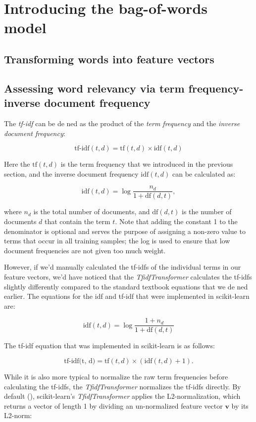 \documentclass[letterpaper]{report}
\begin{document}
\section{Introducing the bag-of-words model}
\subsection{Transforming words into feature vectors}
\subsection{Assessing word relevancy via term frequency-inverse document frequency}

The \textit{tf-idf} can be de ned as the product of the \textit{term frequency} and the \textit{inverse document frequency}:

\[
\text{tf-idf}(t, d) = \text{tf} (t, d) \times \text{idf}(t, d)
\]

Here the $\text{tf}(t, d)$ is the term frequency that we introduced in the previous section,
and the inverse document frequency $\text{idf}(t, d)$ can be calculated as:

\[
\text{idf}(t, d) = \log \frac{n_d}{1 + \text{df}(d, t)},
\]

where $n_d$ is the total number of documents, and $\text{df}(d, t)$  is the number of documents $d$ that contain the term $t$. Note that adding the constant 1 to the denominator is optional and serves the purpose of assigning a non-zero value to terms that occur in all training samples; the log is used to ensure that low document frequencies are not given too much weight.

However, if we'd manually calculated the tf-idfs of the individual terms in our feature vectors, we'd have noticed that the \textit{TfidfTransformer} calculates the tf-idfs slightly differently compared to the standard textbook equations that we de ned earlier. The equations for the idf and tf-idf that were implemented in scikit-learn are:

\[
\text{idf}(t, d) = \log \frac{1 + n_d}{1 + \text{df}(d, t)}
\]

The tf-idf equation that was implemented in scikit-learn is as follows:

\[
\text{tf-idf(t, d)} = \text{tf}(t, d) \times (\text{idf} (t, d) + 1).
\]

While it is also more typical to normalize the raw term frequencies before calculating the tf-idfs, the \textit{TfidfTransformer} normalizes the tf-idfs directly. By default (), scikit-learn's \textit{TfidfTransformer} applies the L2-normalization, which returns a vector of length 1 by dividing an un-normalized feature vector $\mathbf{v}$ by its L2-norm:
\end{document}
